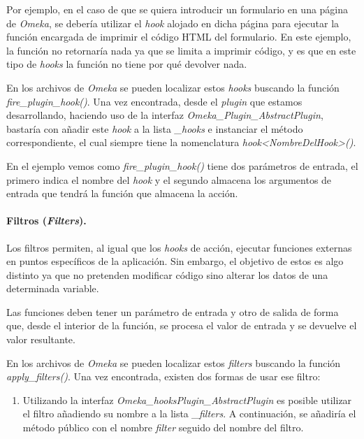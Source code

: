 Por ejemplo, en el caso de que se quiera introducir un formulario en una
página de \emph{Omeka}, se debería utilizar el \emph{hook}
alojado en dicha página para ejecutar la función encargada de imprimir
el código HTML del formulario. En este ejemplo, la función no retornaría
nada ya que se limita a imprimir código, y es que en este tipo de
\emph{hooks} la función no tiene por qué devolver nada.

En los archivos de \emph{Omeka} se pueden localizar estos \emph{hooks} buscando
la función \emph{fire\_plugin\_hook()}. Una vez encontrada, desde el
\emph{plugin} que estamos desarrollando, haciendo uso de la interfaz
\emph{Omeka\_Plugin\_AbstractPlugin}, bastaría con añadir este
\emph{hook} a la lista \emph{\_hooks} e instanciar el método
correspondiente, el cual siempre tiene la nomenclatura
\emph{hook\textless NombreDelHook\textgreater()}.


En el ejemplo vemos como \emph{fire\_plugin\_hook()} tiene dos
parámetros de entrada, el primero indica el nombre del \emph{hook} y el
segundo almacena los argumentos de entrada que tendrá la función que
almacena la acción.


\paragraph{Filtros (\emph{Filters}).}

Los filtros permiten, al igual que los \emph{hooks} de acción, ejecutar
funciones externas en puntos específicos de la aplicación. Sin embargo,
el objetivo de estos es algo distinto ya que no pretenden modificar
código sino alterar los datos de una determinada variable.

Las funciones deben tener un parámetro de entrada y otro de
salida de forma que, desde el interior de la función, se procesa el
valor de entrada y se devuelve el valor resultante.

En los archivos de \emph{Omeka} se pueden localizar estos \emph{filters}
buscando la función \emph{apply\_filters()}. Una vez encontrada, existen
dos formas de usar ese filtro:

\begin{enumerate}
\def\labelenumi{\arabic{enumi}.}
\tightlist
\item
  Utilizando la interfaz \emph{Omeka\_hooksPlugin\_AbstractPlugin} es posible
  utilizar el filtro añadiendo su nombre a la lista \emph{\_filters}. A
  continuación, se añadiría el método público con el nombre
  \emph{filter} seguido del nombre del filtro.
\end{enumerate}

